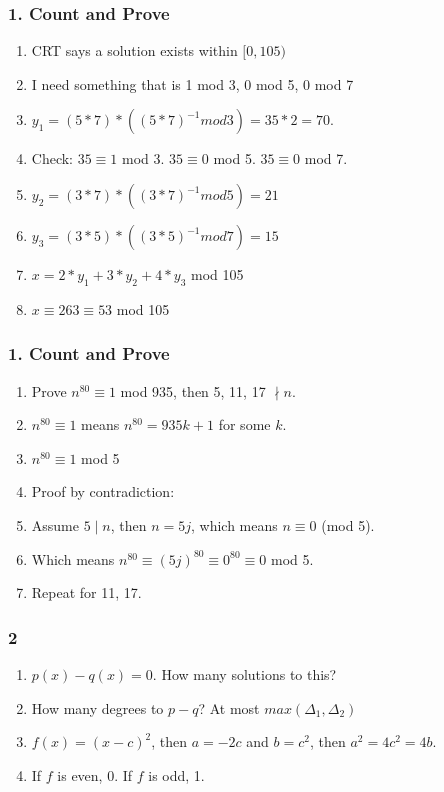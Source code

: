 \documentclass{beamer}
\begin{document}
\begin{frame}

    \frametitle{1. Count and Prove}

    \begin{enumerate}[<+->]
        \item CRT says a solution exists within $[0, 105)$
        \item I need something that is 1 mod 3, 0 mod 5, 0 mod 7
        \item $y_1 = (5  * 7) * ((5 * 7)^{-1} mod 3) = 35 * 2 = 70$.
        \item Check: $35 \equiv 1$ mod 3. $35 \equiv 0$ mod 5. $35 \equiv 0$ mod 7.  
        \item $y_2 = (3*7) * ((3*7)^{-1} mod 5) = 21$
        \item $y_3 = (3 * 5) * ((3 * 5)^{-1} mod 7) = 15$
        \item $x = 2 * y_1 + 3 * y_2 + 4 * y_3$ mod 105
        \item $x \equiv 263 \equiv 53$ mod 105
    \end{enumerate}
\end{frame}


\begin{frame}

    \frametitle{1. Count and Prove}
    \begin{enumerate}[<+->]
        \item Prove $n^{80} \equiv 1$ mod 935, then 5, 11, 17 $\nmid n$.
        \item $n^{80} \equiv 1$ means $n^{80} = 935k + 1$ for some $k$.
        \item $n^{80} \equiv 1$ mod 5
        \item Proof by contradiction:
        \item Assume $5 \mid n$, then $n = 5j$, which means $n \equiv 0$ (mod 5).
        \item Which means $n^{80} \equiv (5j)^{80} \equiv 0^{80} \equiv 0$ mod 5.
        \item Repeat for 11, 17.
    
    \end{enumerate}
\end{frame}

\begin{frame}

    \frametitle{2}
    \begin{enumerate}[<+->]
        \item $p(x) - q(x) = 0$. How many solutions to this?
        \item How many degrees to $p - q$? At most $max(\Delta_1, \Delta_2)$
        \item $f(x) = (x - c)^2$, then $a = -2c$ and $b = c^2$, then $a^2 = 4c^2 = 4b$. 
        \item If $f$ is even, 0. If $f$ is odd, 1.
    \end{enumerate}
\end{frame}
\end{document}
